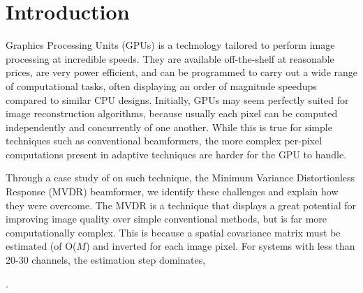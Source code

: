 \documentclass[
a4paper,10pt
]{ica2013_2}
\newcommand\1{\vec 1}
\begin{document}


\section{Introduction}

Graphics Processing Units (GPUs) is a technology tailored to perform image processing at incredible speeds. They are available off-the-shelf at reasonable prices, are very power efficient, and can be programmed to carry out a wide range of computational tasks, often displaying an order of magnitude speedups compared to similar CPU designs. Initially, GPUs may seem perfectly suited for image reconstruction algorithms, because usually each pixel can be computed independently and concurrently of one another. While this is true for simple techniques such as conventional beamformers, the more complex per-pixel computations present in adaptive techniques are harder for the GPU to handle.


Through a case study of on such technique, the Minimum Variance Distortionless Response (MVDR) beamformer, we identify these challenges and explain how they were overcome. The MVDR is a technique that displays a great potential for improving image quality over simple conventional methods, but is far more computationally complex. This is because a spatial covariance matrix must be estimated (of O($M$) and inverted for each image pixel.  For systems with less than 20-30 channels, the estimation step dominates,   %

 .
\end{document}
